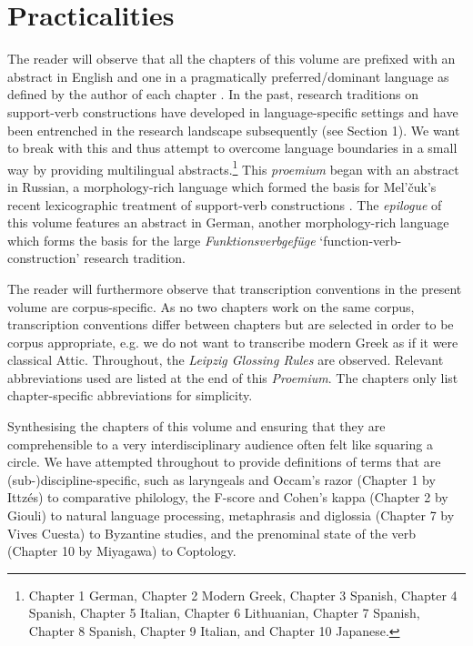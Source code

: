 \documentclass[output=paper,colorlinks,citecolor=brown]{langscibook}
\begin{document}
\section{Practicalities}
The reader will observe that all the chapters of this volume are prefixed with an abstract in English and one in a pragmatically preferred/dominant language as defined by the author of each chapter \citep[23]{matrasLanguageContact2009}. In the past, research traditions on support-verb constructions have developed in language-specific settings and have been entrenched in the research landscape subsequently (see Section 1). We want to break with this and thus attempt to overcome language boundaries in a small way by providing multilingual abstracts.\footnote{Chapter 1 German, Chapter 2 Modern Greek, Chapter 3 Spanish, Chapter 4 Spanish, Chapter 5 Italian, Chapter 6 Lithuanian, Chapter 7 Spanish, Chapter 8 Spanish, Chapter 9 Italian, and Chapter 10 Japanese.} This \textit{proemium} began with an abstract in Russian, a morphology-rich language which formed the basis for Mel’čuk’s recent lexicographic treatment of support-verb constructions \citep{melcukGeneralPhraseology2023}. The \textit{epilogue} of this volume features an abstract in German, another morphology-rich language which forms the basis for the large \textit{Funktionsverbgefüge} ‘function-verb-construction’ research tradition. 

The reader will furthermore observe that transcription conventions in the present volume are corpus-specific. As no two chapters work on the same corpus, transcription conventions differ between chapters but are selected in order to be corpus appropriate, e.g. we do not want to transcribe modern Greek as if it were classical Attic. Throughout, the \textit{Leipzig Glossing Rules} are observed. Relevant abbreviations used are listed at the end of this \textit{Proemium}. The chapters only list chapter-specific abbreviations for simplicity. 


Synthesising the chapters of this volume and ensuring that they are comprehensible to a very interdisciplinary audience often felt like squaring a circle. We have attempted throughout to provide definitions of terms that are (sub\nobreakdash-)discipline-specific, such as laryngeals and Occam’s razor (Chapter 1 by Ittzés) to comparative philology, the F-score and Cohen’s kappa (Chapter 2 by Giouli) to natural language processing, metaphrasis and diglossia (Chapter 7 by Vives Cuesta) to Byzantine studies, and the prenominal state of the verb (Chapter 10 by Miyagawa) to Coptology. 
\end{document}
